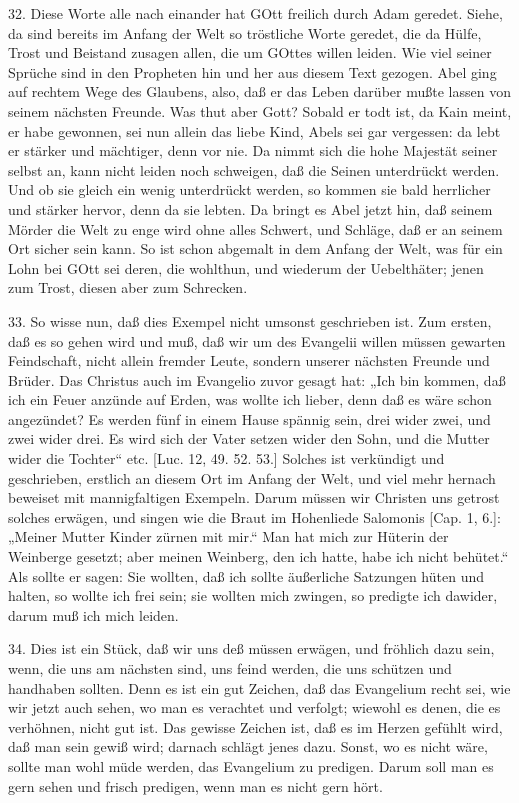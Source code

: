 32. Diese Worte alle nach einander hat GOtt freilich durch Adam geredet. Siehe, da sind bereits im Anfang der Welt so tröstliche Worte geredet, die da Hülfe, Trost und Beistand zusagen allen, die um GOttes willen leiden. Wie viel seiner Sprüche sind in den Propheten hin und her aus diesem Text gezogen. Abel ging auf rechtem Wege des Glaubens, also, daß er das Leben darüber mußte lassen von seinem nächsten Freunde. Was thut aber Gott? Sobald er todt ist, da Kain meint, er habe gewonnen, sei nun allein das liebe Kind, Abels sei gar vergessen: da lebt er stärker und mächtiger, denn vor nie. Da nimmt sich die hohe Majestät seiner selbst an, kann nicht leiden noch schweigen, daß die Seinen unterdrückt werden. Und ob sie gleich ein wenig unterdrückt werden, so kommen sie bald herrlicher und stärker hervor, denn da sie lebten. Da bringt es Abel jetzt hin, daß seinem Mörder die Welt zu enge wird ohne alles Schwert, und Schläge, daß er an seinem Ort sicher sein kann. So ist schon abgemalt in dem Anfang der Welt, was für ein Lohn bei GOtt sei deren, die wohlthun, und wiederum der Uebelthäter; jenen zum Trost, diesen aber zum Schrecken.

33. So wisse nun, daß dies Exempel nicht umsonst geschrieben ist. Zum ersten, daß es so gehen wird und muß, daß wir um des Evangelii willen müssen gewarten Feindschaft, nicht allein fremder Leute, sondern unserer nächsten Freunde und Brüder. Das Christus auch im Evangelio zuvor gesagt hat: „Ich bin kommen, daß ich ein Feuer anzünde auf Erden, was wollte ich lieber, denn daß es wäre schon angezündet? Es werden fünf in einem Hause spännig sein, drei wider zwei, und zwei wider drei. Es wird sich der Vater setzen wider den Sohn, und die Mutter wider die Tochter“ etc. [Luc. 12, 49. 52. 53.] Solches ist verkündigt und geschrieben, erstlich an diesem Ort im Anfang der Welt, und viel mehr hernach beweiset mit mannigfaltigen Exempeln. Darum müssen wir Christen uns getrost solches erwägen, und singen wie die Braut im Hohenliede Salomonis [Cap. 1, 6.]: „Meiner Mutter Kinder zürnen mit mir.“ Man hat mich zur
Hüterin der Weinberge gesetzt; aber meinen Weinberg, den ich hatte, habe ich nicht behütet.“ Als sollte er sagen: Sie wollten, daß ich sollte äußerliche Satzungen hüten und halten, so wollte ich frei sein; sie wollten mich zwingen, so predigte ich dawider, darum muß ich mich leiden.

34. Dies ist ein Stück, daß wir uns deß müssen erwägen, und fröhlich dazu sein, wenn, die uns am nächsten sind, uns feind werden, die uns schützen und handhaben sollten. Denn es ist ein gut Zeichen, daß das Evangelium recht sei, wie wir jetzt auch sehen, wo man es verachtet und verfolgt; wiewohl es denen, die es verhöhnen, nicht gut ist. Das gewisse Zeichen ist, daß es im Herzen gefühlt wird, daß man sein gewiß wird; darnach schlägt jenes dazu. Sonst, wo es nicht wäre, sollte man wohl müde werden, das Evangelium zu predigen. Darum soll man es gern sehen und frisch predigen, wenn man es nicht gern hört.

